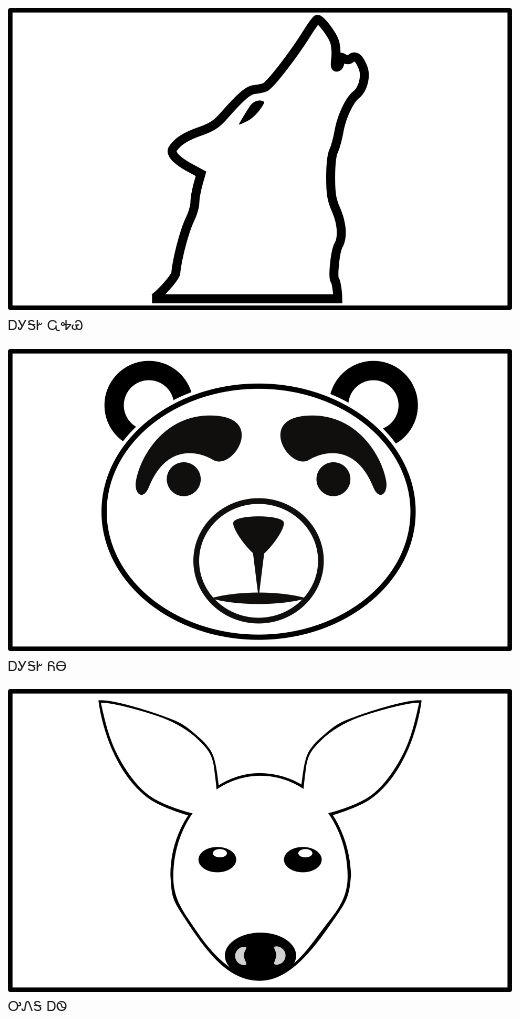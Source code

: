 \documentclass[avery5371]{flashcards}%
\begin{document}
    \begin{flashcard}{
        \includegraphics[width=0.95\columnwidth,height=.51\columnwidth,keepaspectratio]{../artwork/objects-animate/wahya}
    }
        \Huge ᎠᎩᎦᎨ ᏩᎭᏯ
    \end{flashcard}

    \begin{flashcard}{
        \includegraphics[width=0.95\columnwidth,height=.51\columnwidth,keepaspectratio]{../artwork/objects-animate/yona}
    }
        \Huge ᎠᎩᎦᎨ ᏲᎾ
    \end{flashcard}

    \begin{flashcard}{
        \includegraphics[width=0.95\columnwidth,height=.51\columnwidth,keepaspectratio]{../artwork/objects-animate/ahwi}
    }
        \Huge ᎤᏁᎦ ᎠᏫ
    \end{flashcard}
\end{document}
